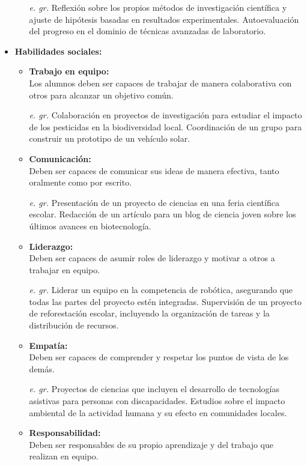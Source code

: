 \begin{itemize}
\begin{itemize}
         \item[\textit{e. gr.}]
        Reflexión sobre los propios métodos de investigación científica y ajuste de hipótesis basadas en resultados experimentales. Autoevaluación del progreso en el dominio de técnicas avanzadas de laboratorio.
    \end{itemize}
    \item \textbf{Habilidades sociales:}
    \begin{itemize}
        \item \textbf{Trabajo en equipo: }\\
        Los alumnos deben ser capaces de trabajar de manera colaborativa con otros para alcanzar un objetivo común.
        \item[\textit{e. gr.}] Colaboración en proyectos de investigación para estudiar el impacto de los pesticidas en la biodiversidad local. Coordinación de un grupo para construir un prototipo de un vehículo solar.
        \item \textbf{Comunicación: }\\
        Deben ser capaces de comunicar sus ideas de manera efectiva, tanto oralmente como por escrito.
        \item[\textit{e. gr.}]Presentación de un proyecto de ciencias en una feria científica escolar. Redacción de un artículo para un blog de ciencia joven sobre los últimos avances en biotecnología.
        \item \textbf{Liderazgo:}\\
        Deben ser capaces de asumir roles de liderazgo y motivar a otros a trabajar en equipo.
        \item[\textit{e. gr.}]Liderar un equipo en la competencia de robótica, asegurando que todas las partes del proyecto estén integradas. Supervisión de un proyecto de reforestación escolar, incluyendo la organización de tareas y la distribución de recursos.
        \item \textbf{Empatía:}\\
         Deben ser capaces de comprender y respetar los puntos de vista de los demás.
         \item[\textit{e. gr.}] Proyectos de ciencias que incluyen el desarrollo de tecnologías asistivas para personas con discapacidades. Estudios sobre el impacto ambiental de la actividad humana y su efecto en comunidades locales.
         \item \textbf{Responsabilidad: }\\
         Deben ser responsables de su propio aprendizaje y del trabajo que realizan en equipo.

\end{itemize}
\end{itemize}
